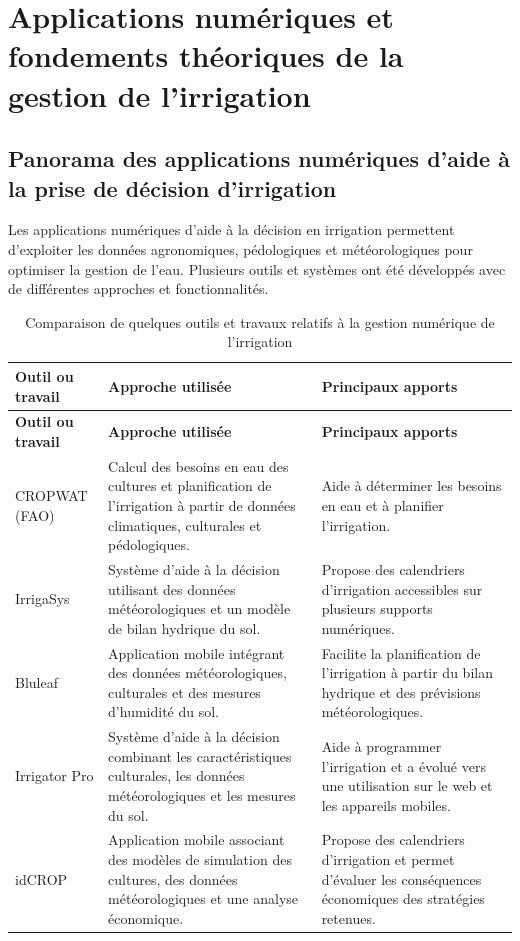 \section{Applications numériques et fondements théoriques de la gestion de l’irrigation}
\subsection{Panorama des applications numériques d’aide à la prise de décision d’irrigation}
Les applications numériques d'aide à la décision en irrigation permettent d'exploiter les données agronomiques, pédologiques et météorologiques pour optimiser la gestion de l'eau. 
Plusieurs outils et systèmes ont été développés avec de différentes approches et fonctionnalités.

{\small
\begin{longtable}{|p{3.4cm}|p{5.6cm}|p{5cm}|}
    \caption{Comparaison de quelques outils et travaux relatifs à la gestion numérique de l'irrigation}
    \label{tab:comparaison_outils_irrigation} \\
    \hline
    \textbf{Outil ou travail} & \textbf{Approche utilisée} & \textbf{Principaux apports} \\
    \hline
    \endfirsthead
    \hline
    \textbf{Outil ou travail} & \textbf{Approche utilisée} & \textbf{Principaux apports} \\
    \hline
    \endhead
    CROPWAT (FAO) & Calcul des besoins en eau des cultures et planification de l'irrigation à partir de données climatiques, culturales et pédologiques. & Aide à déterminer les besoins en eau et à planifier l'irrigation. \\
    \hline
    IrrigaSys & Système d'aide à la décision utilisant des données météorologiques et un modèle de bilan hydrique du sol. & Propose des calendriers d'irrigation accessibles sur plusieurs supports numériques. \\
    \hline
    Bluleaf & Application mobile intégrant des données météorologiques, culturales et des mesures d'humidité du sol. & Facilite la planification de l'irrigation à partir du bilan hydrique et des prévisions météorologiques. \\
    \hline
    Irrigator Pro & Système d'aide à la décision combinant les caractéristiques culturales, les données météorologiques et les mesures du sol. & Aide à programmer l'irrigation et a évolué vers une utilisation sur le web et les appareils mobiles. \\
    \hline
    idCROP & Application mobile associant des modèles de simulation des cultures, des données météorologiques et une analyse économique. & Propose des calendriers d'irrigation et permet d'évaluer les conséquences économiques des stratégies retenues. \\
    \hline
\end{longtable}
}

